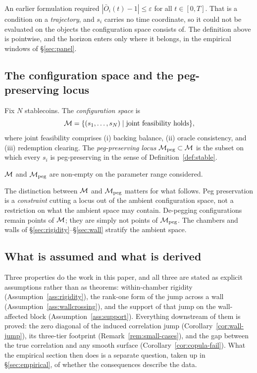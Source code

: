 \begin{remark}\label{rem:pointwise}
An earlier formulation required $|\bar{O}_i(t) - 1| \le \varepsilon$ for all $t \in [0,T]$. That is a condition on a \emph{trajectory}, and $s_i$ carries no time coordinate, so it could not be evaluated on the objects the configuration space consists of. The definition above is pointwise, and the horizon enters only where it belongs, in the empirical windows of \S\ref{sec:panel}.
\end{remark}

\subsection{The configuration space and the peg-preserving locus}\label{sec:mpeg}
\begin{definition}\label{def:mconf}
Fix $N$ stablecoins. The \emph{configuration space} is
\[
\mathcal{M} = \{(s_1,\ldots,s_N) \mid \text{joint feasibility holds}\},
\]
where joint feasibility comprises (i) backing balance, (ii) oracle consistency, and (iii) redemption clearing. The \emph{peg-preserving locus} $\mathcal{M}_{\mathrm{peg}} \subset \mathcal{M}$ is the subset on which every $s_i$ is peg-preserving in the sense of Definition~\ref{def:stable}.
\end{definition}

\begin{assumption}\label{ass:nonempty}
$\mathcal{M}$ and $\mathcal{M}_{\mathrm{peg}}$ are non-empty on the parameter range considered.
\end{assumption}

The distinction between $\mathcal{M}$ and $\mathcal{M}_{\mathrm{peg}}$ matters for what follows. Peg preservation is a \emph{constraint} cutting a locus out of the ambient configuration space, not a restriction on what the ambient space may contain. De-pegging configurations remain points of $\mathcal{M}$; they are simply not points of $\mathcal{M}_{\mathrm{peg}}$. The chambers and walls of \S\ref{sec:rigidity}--\S\ref{sec:wall} stratify the ambient space.

\subsection{What is assumed and what is derived}\label{sec:what-is-assumed}
Three properties do the work in this paper, and all three are stated as explicit assumptions rather than as theorems: within-chamber rigidity (Assumption~\ref{ass:rigidity}), the rank-one form of the jump across a wall (Assumption~\ref{ass:wallcrossing}), and the support of that jump on the wall-affected block (Assumption~\ref{ass:support}). Everything downstream of them is proved: the zero diagonal of the induced correlation jump (Corollary~\ref{cor:wall-jump}), its three-tier footprint (Remark~\ref{rem:small-cases}), and the gap between the true correlation and any smooth surface (Corollary~\ref{cor:copula-fail}). What the empirical section then does is a separate question, taken up in \S\ref{sec:empirical}, of whether the consequences describe the data.


